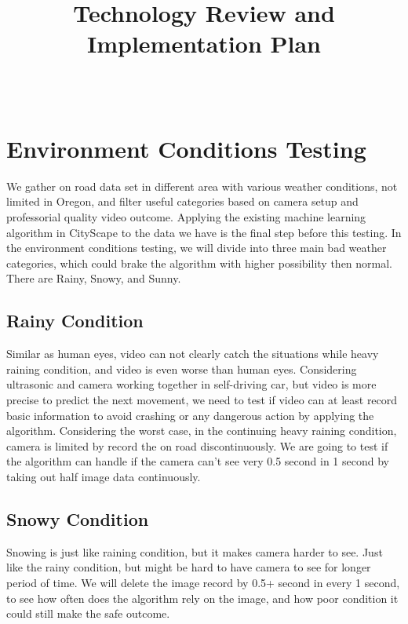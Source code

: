 \documentclass[10pt,draftclsnofoot,onecolumn,journal,compsoc]{IEEEtran}
\title{Technology Review and Implementation Plan}
\author{
  \IEEEauthorblockN{Team (Group 32) name: Teaching AutoPilot to Dodge\\ Author: Xilun Guo\\Team members: Basil Al Zamil and Tanner Fry} \\
  \IEEEauthorblockA{CS 461: Senior Capstone Fall 2016 \\ Oregon State University}
}
\date{}
\begin{document}
\maketitle
\IEEEdisplaynontitleabstractindextext
\IEEEpeerreviewmaketitle

\newpage

\tableofcontents

\newpage

\section{Environment Conditions Testing}
We gather on road data set in different area with various weather conditions, not limited in Oregon, and filter useful categories based on camera setup and professorial quality video outcome. Applying the existing machine learning algorithm in CityScape to the data we have is the final step before this testing. In the environment conditions testing, we will divide into three main bad weather categories, which could brake the algorithm with higher possibility then normal. There are Rainy, Snowy, and Sunny.

\subsection{Rainy Condition}
Similar as human eyes, video can not clearly catch the situations while heavy raining condition, and video is even worse than human eyes. Considering ultrasonic and camera working together in self-driving car, but video is more precise to predict the next movement, we need to test if video can at least record basic information to avoid crashing or any dangerous action by applying the algorithm. Considering the worst case, in the continuing heavy raining condition, camera is limited by record the on road discontinuously. We are going to test if the algorithm can handle if the camera can't see very 0.5 second in 1 second by taking out half image data continuously.    

\subsection{Snowy Condition}
Snowing is just like raining condition, but it makes camera harder to see. Just like the rainy condition, but might be hard to have camera to see for longer period of time. We will delete the image record by 0.5+ second in every 1 second, to see how often does the algorithm rely on the image, and how poor condition it could still make the safe outcome.  
\end{document}
